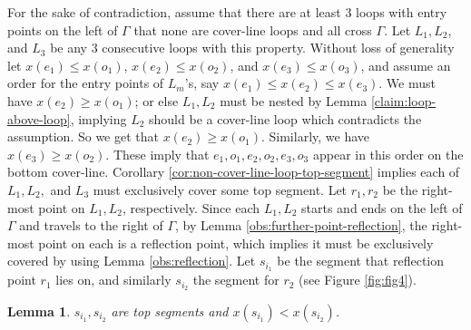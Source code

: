 \documentclass[pdflatex,sn-mathphys-num]{sn-jnl}
\theoremstyle{thmstyleone}
\newtheorem{lemma}{Lemma}
\begin{document}
    For the sake of contradiction, assume that there are at least $3$ loops with entry points on the left of $\Gamma$ that none are cover-line loops and all cross $\Gamma$. Let $L_1, L_2$, and $L_3$ be any $3$ consecutive loops with this property. 
    Without loss of generality let $x(e_1) \le x(o_1)$, $x(e_2)\leq x(o_2)$, and $x(e_3)\leq x(o_3)$, and assume an order for the entry points of $L_m$'s, say $x(e_1) \le x(e_2) \le x(e_3)$. We must have $x(e_2) \ge x(o_1)$; or else $L_1,L_2$ must be nested by Lemma \ref{claim:loop-above-loop}, implying $L_2$ should be a cover-line loop which contradicts the assumption.
    So we get that $x(e_2) \ge x(o_1)$. Similarly, we have $x(e_3) \ge x(o_2)$. 
    These imply that $e_1,o_1,e_2,o_2,e_3,o_3$ appear in this order on the bottom cover-line.
    Corollary \ref{cor:non-cover-line-loop-top-segment} implies each of $L_1, L_2,$ and $L_3$ must exclusively cover some top segment.
    Let $r_1,r_2$ be the right-most point on $L_1,L_2$, respectively. 
    Since each $L_1,L_2$ starts and ends on the left of $\Gamma$ and travels to the right of $\Gamma$, by Lemma \ref{obs:further-point-reflection}, the right-most point on each is a reflection point, which implies it must be exclusively covered by using Lemma \ref{obs:reflection}. Let $s_{i_1}$ be the segment that
    reflection point $r_1$ lies on, and similarly $s_{i_2}$ the segment for $r_2$ (see Figure \ref{fig:fig4}).

\begin{lemma}\label{claim:top-segments-on-right}
    $s_{i_1},s_{i_2}$ are top segments and $x(s_{i_1})<x(s_{i_2})$.
\end{lemma}
\end{document}
